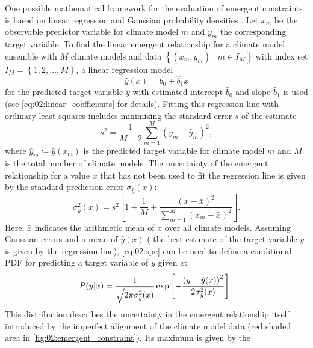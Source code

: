 One possible mathematical framework for the evaluation of emergent constraints
is based on linear regression and Gaussian probability densities
\autocite{Cox2013, Cox2018}. Let $x_m$ be the observable predictor variable for
climate model $m$ and $y_m$ the corresponding target variable. To find the
linear emergent relationship for a climate model ensemble with $M$ climate
models and data $\left\{ \left( x_m, y_m \right) \mid m \in I_M \right\}$ with
index set $I_M = \left\{ 1, 2, \ldots, M\right\}$, a linear
regression model
\begin{equation}
  \hat{y}(x) = \hat{b}_0 + \hat{b}_1 x
  \label{eq:02:linear_regression_y}
\end{equation}
for the predicted target variable $\hat{y}$ with estimated intercept
$\hat{b}_0$ and slope $\hat{b}_1$ is used (see \cref{eq:02:linear_coefficients}
for details). Fitting this regression line with ordinary least squares includes
minimizing the standard error $s$ of the estimate
\begin{equation}
  s^2 = \frac{1}{M - 2} \sum_{m=1}^M \left( y_m - \hat{y}_m \right)^2,
  \label{eq:02:sse}
\end{equation}
where $\hat{y}_m \coloneq \hat{y}(x_m)$ is the predicted target variable for
climate model $m$ and $M$ is the total number of climate models. The
uncertainty of the emergent relationship for a value $x$ that has not been used
to fit the regression line is given by the standard prediction error
$\sigma_{\hat{y}}(x)$:
\begin{equation}
  \sigma_{\hat{y}}^2(x) = s^2 \left[ 1 + \frac{1}{M} + \frac{\left( x - \bar{x}
    \right)^2}{\sum_{m=1}^M \left( x_m - \bar{x} \right)^2} \right].
  \label{eq:02:spe}
\end{equation}
Here, $\bar{x}$ indicates the arithmetic mean of $x$ over all climate models.
Assuming Gaussian errors and a mean of $\hat{y}(x)$ (\ie{} the best estimate of
the target variable $y$ is given by the regression line), \cref{eq:02:spe} can
be used to define a conditional \acf{PDF} for predicting a target variable of
$y$ given $x$:
\begin{equation}
  P(y|x) = \frac{1}{\sqrt{2 \pi \sigma_{\hat{y}}^2(x)}} \exp \left[
    -\frac{\left( y - \hat{y}(x) \right)^2}{2 \sigma_{\hat{y}}^2(x)} \right].
  \label{eq:02:pdf_y_given_x}
\end{equation}
This distribution describes the uncertainty in the emergent relationship itself
introduced by the imperfect alignment of the climate model data (red shaded
area in \cref{fig:02:emergent_constraint}). Its maximum is given by the
